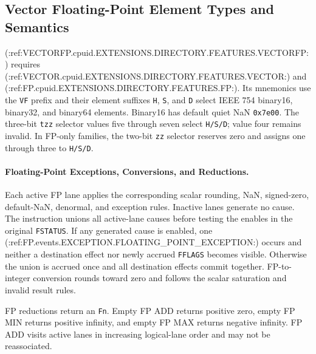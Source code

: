 \subsection{Vector Floating-Point Element Types and Semantics}

(:ref:VECTORFP.cpuid.EXTENSIONS.DIRECTORY.FEATURES.VECTORFP:) requires (:ref:VECTOR.cpuid.EXTENSIONS.DIRECTORY.FEATURES.VECTOR:) and (:ref:FP.cpuid.EXTENSIONS.DIRECTORY.FEATURES.FP:). Its mnemonics
use the \texttt{VF} prefix and their element suffixes \texttt{H}, \texttt{S},
and \texttt{D} select IEEE 754 binary16, binary32, and binary64 elements.
Binary16 has default quiet NaN \texttt{0x7e00}. The three-bit \texttt{tzz}
selector values five through seven select \texttt{H/S/D}; value four remains
invalid. In FP-only families, the two-bit \texttt{zz} selector reserves zero
and assigns one through three to \texttt{H/S/D}.

\paragraph{Floating-Point Exceptions, Conversions, and Reductions.}

Each active FP lane applies the corresponding scalar rounding, NaN,
signed-zero, default-NaN, denormal, and exception rules.  Inactive lanes
generate no cause.  The instruction unions all active-lane causes before
testing the enables in the original \texttt{FSTATUS}.  If any generated cause
is enabled, one (:ref:FP.events.EXCEPTION.FLOATING_POINT_EXCEPTION:) occurs and neither a destination
effect nor newly accrued \texttt{FFLAGS} becomes visible.  Otherwise the union
is accrued once and all destination effects commit together.  FP-to-integer
conversion rounds toward zero and follows the scalar saturation and invalid
result rules.

FP reductions return an \texttt{Fn}.  Empty FP ADD returns positive zero, empty FP
MIN returns positive infinity, and empty FP MAX returns negative infinity.
FP ADD visits active lanes in increasing logical-lane order and may not be
reassociated.
